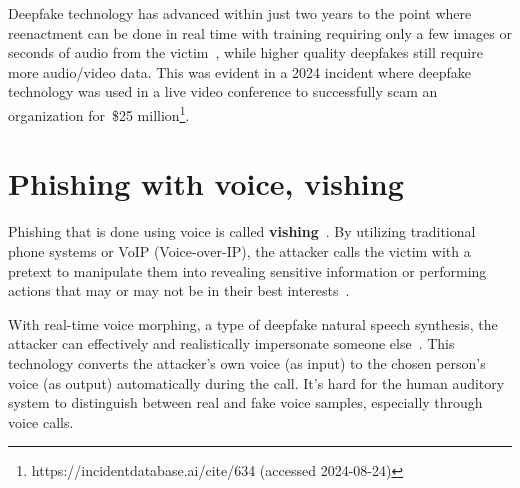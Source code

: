 Deepfake technology has advanced within just two years to the point where reenactment can be done in real time with training requiring only a few images or seconds of audio from the victim~\citep{mirsky_Threat_Offensive_AI_Organizations_2023}, while higher quality deepfakes still require more audio/video data. This was evident in a 2024 incident where deepfake technology was used in a live video conference to successfully scam an organization for~\$25 million\footnote{https://incidentdatabase.ai/cite/634 (accessed 2024-08-24)}.





























\section{Phishing with voice, vishing}
\begin{comment}
What to cover:
    - Including spear phishing with video in this section?
    

\end{comment}

Phishing that is done using voice is called \textbf{vishing}~\citep{doan_BTSE_Audio_Deepfake_Detection_2023}. By utilizing traditional phone systems or VoIP (Voice-over-IP), the attacker calls the victim with a pretext to manipulate them into revealing sensitive information or performing actions that may or may not be in their best interests~\citep{hadnagy_Social_Engineering_The_Science_2018}.



With real-time voice morphing, a type of deepfake natural speech synthesis, the attacker can effectively and realistically impersonate someone else~\citep{doan_BTSE_Audio_Deepfake_Detection_2023}. This technology converts the attacker's own voice (as input) to the chosen person's voice (as output) automatically during the call. It's hard for the human auditory system to distinguish between real and fake voice samples, especially through voice calls.

